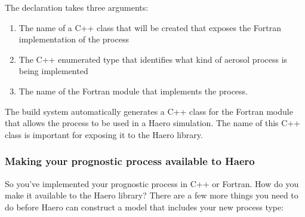 The declaration takes three arguments:

\begin{enumerate}
  \item The name of a C++ class that will be created that exposes the Fortran
        implementation of the process
  \item The C++ enumerated type that identifies what kind of aerosol process
        is being implemented
  \item The name of the Fortran module that implements the process.
\end{enumerate}

The build system automatically generates a C++ class for the Fortran module that
allows the process to be used in a Haero simulation. The name of this C++ class
is important for exposing it to the Haero library.

\subsubsection{Making your prognostic process available to Haero}

So you've implemented your prognostic process in C++ or Fortran. How do you
make it available to the Haero library? There are a few more things you need to
do before Haero can construct a model that includes your new process type:


